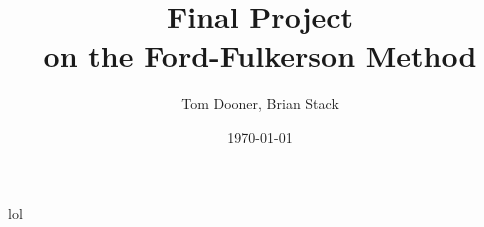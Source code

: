 \documentclass[letterpaper]{report}
\title{Final Project\\ \small{ on the Ford-Fulkerson Method}}
\author{Tom Dooner, Brian Stack}
\date{\today}
\begin{document}
\maketitle
lol
\end{document}
